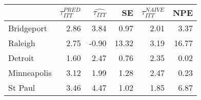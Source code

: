 
\begin{tabular}{lrrrrr}
\toprule
  & $\tau_{ITT}^{PRED}$ & $\hat{\tau_{ITT}}$ & SE & $\tau_{ITT}^{NAIVE}$ & NPE\\
\midrule
Bridgeport & 2.86 & 3.84 & 0.97 & 2.01 & 3.37\\
Raleigh & 2.75 & -0.90 & 13.32 & 3.19 & 16.77\\
Detroit & 1.60 & 2.47 & 0.76 & 2.35 & 0.02\\
Minneapolis & 3.12 & 1.99 & 1.28 & 2.47 & 0.23\\
St Paul & 3.46 & 4.47 & 1.02 & 1.85 & 6.87\\
\bottomrule
\end{tabular}